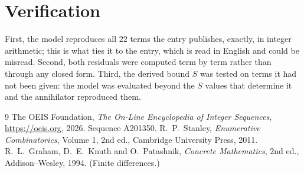 \documentclass[11pt,a4paper]{article}
\theoremstyle{plain}
\theoremstyle{definition}
\begin{document}
\section{Verification}

First, the model reproduces all $22$ terms the entry publishes, exactly, in integer
arithmetic; this is what ties it to the entry, which is read in English and could be misread.
Second, both residuals were computed term by term rather than through any closed form. Third,
the derived bound $S$ was tested on terms it had not been given: the model was evaluated beyond
the $S$ values that determine it and the annihilator reproduced them.

\begin{thebibliography}{9}
 The OEIS Foundation, \emph{The On-Line Encyclopedia of Integer Sequences},
\url{https://oeis.org}, 2026. Sequence A201350.
 R.~P.~Stanley, \emph{Enumerative Combinatorics}, Volume 1, 2nd ed.,
Cambridge University Press, 2011.
 R.~L.~Graham, D.~E.~Knuth and O.~Patashnik, \emph{Concrete Mathematics},
2nd ed., Addison--Wesley, 1994. (Finite differences.)
\end{thebibliography}
\end{document}
